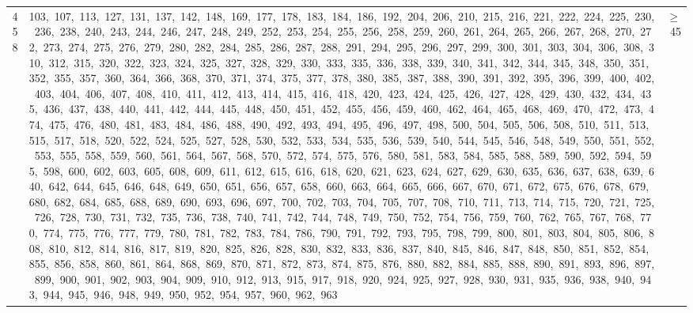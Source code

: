 \begin{longtable}{c|p{}|r}
458 & 103,\ 107,\ 113,\ 127,\ 131,\ 137,\ 142,\ 148,\ 169,\ 177,\ 178,\ 183,\ 184,\ 186,\ 192,\ 204,\ 206,\ 210,\ 215,\ 216,\ 221,\ 222,\ 224,\ 225,\ 230,\ 236,\ 238,\ 240,\ 243,\ 244,\ 246,\ 247,\ 248,\ 249,\ 252,\ 253,\ 254,\ 255,\ 256,\ 258,\ 259,\ 260,\ 261,\ 264,\ 265,\ 266,\ 267,\ 268,\ 270,\ 272,\ 273,\ 274,\ 275,\ 276,\ 279,\ 280,\ 282,\ 284,\ 285,\ 286,\ 287,\ 288,\ 291,\ 294,\ 295,\ 296,\ 297,\ 299,\ 300,\ 301,\ 303,\ 304,\ 306,\ 308,\ 310,\ 312,\ 315,\ 320,\ 322,\ 323,\ 324,\ 325,\ 327,\ 328,\ 329,\ 330,\ 333,\ 335,\ 336,\ 338,\ 339,\ 340,\ 341,\ 342,\ 344,\ 345,\ 348,\ 350,\ 351,\ 352,\ 355,\ 357,\ 360,\ 364,\ 366,\ 368,\ 370,\ 371,\ 374,\ 375,\ 377,\ 378,\ 380,\ 385,\ 387,\ 388,\ 390,\ 391,\ 392,\ 395,\ 396,\ 399,\ 400,\ 402,\ 403,\ 404,\ 406,\ 407,\ 408,\ 410,\ 411,\ 412,\ 413,\ 414,\ 415,\ 416,\ 418,\ 420,\ 423,\ 424,\ 425,\ 426,\ 427,\ 428,\ 429,\ 430,\ 432,\ 434,\ 435,\ 436,\ 437,\ 438,\ 440,\ 441,\ 442,\ 444,\ 445,\ 448,\ 450,\ 451,\ 452,\ 455,\ 456,\ 459,\ 460,\ 462,\ 464,\ 465,\ 468,\ 469,\ 470,\ 472,\ 473,\ 474,\ 475,\ 476,\ 480,\ 481,\ 483,\ 484,\ 486,\ 488,\ 490,\ 492,\ 493,\ 494,\ 495,\ 496,\ 497,\ 498,\ 500,\ 504,\ 505,\ 506,\ 508,\ 510,\ 511,\ 513,\ 515,\ 517,\ 518,\ 520,\ 522,\ 524,\ 525,\ 527,\ 528,\ 530,\ 532,\ 533,\ 534,\ 535,\ 536,\ 539,\ 540,\ 544,\ 545,\ 546,\ 548,\ 549,\ 550,\ 551,\ 552,\ 553,\ 555,\ 558,\ 559,\ 560,\ 561,\ 564,\ 567,\ 568,\ 570,\ 572,\ 574,\ 575,\ 576,\ 580,\ 581,\ 583,\ 584,\ 585,\ 588,\ 589,\ 590,\ 592,\ 594,\ 595,\ 598,\ 600,\ 602,\ 603,\ 605,\ 608,\ 609,\ 611,\ 612,\ 615,\ 616,\ 618,\ 620,\ 621,\ 623,\ 624,\ 627,\ 629,\ 630,\ 635,\ 636,\ 637,\ 638,\ 639,\ 640,\ 642,\ 644,\ 645,\ 646,\ 648,\ 649,\ 650,\ 651,\ 656,\ 657,\ 658,\ 660,\ 663,\ 664,\ 665,\ 666,\ 667,\ 670,\ 671,\ 672,\ 675,\ 676,\ 678,\ 679,\ 680,\ 682,\ 684,\ 685,\ 688,\ 689,\ 690,\ 693,\ 696,\ 697,\ 700,\ 702,\ 703,\ 704,\ 705,\ 707,\ 708,\ 710,\ 711,\ 713,\ 714,\ 715,\ 720,\ 721,\ 725,\ 726,\ 728,\ 730,\ 731,\ 732,\ 735,\ 736,\ 738,\ 740,\ 741,\ 742,\ 744,\ 748,\ 749,\ 750,\ 752,\ 754,\ 756,\ 759,\ 760,\ 762,\ 765,\ 767,\ 768,\ 770,\ 774,\ 775,\ 776,\ 777,\ 779,\ 780,\ 781,\ 782,\ 783,\ 784,\ 786,\ 790,\ 791,\ 792,\ 793,\ 795,\ 798,\ 799,\ 800,\ 801,\ 803,\ 804,\ 805,\ 806,\ 808,\ 810,\ 812,\ 814,\ 816,\ 817,\ 819,\ 820,\ 825,\ 826,\ 828,\ 830,\ 832,\ 833,\ 836,\ 837,\ 840,\ 845,\ 846,\ 847,\ 848,\ 850,\ 851,\ 852,\ 854,\ 855,\ 856,\ 858,\ 860,\ 861,\ 864,\ 868,\ 869,\ 870,\ 871,\ 872,\ 873,\ 874,\ 875,\ 876,\ 880,\ 882,\ 884,\ 885,\ 888,\ 890,\ 891,\ 893,\ 896,\ 897,\ 899,\ 900,\ 901,\ 902,\ 903,\ 904,\ 909,\ 910,\ 912,\ 913,\ 915,\ 917,\ 918,\ 920,\ 924,\ 925,\ 927,\ 928,\ 930,\ 931,\ 935,\ 936,\ 938,\ 940,\ 943,\ 944,\ 945,\ 946,\ 948,\ 949,\ 950,\ 952,\ 954,\ 957,\ 960,\ 962,\ 963 & $\ge$ 45 \\

\end{longtable}
